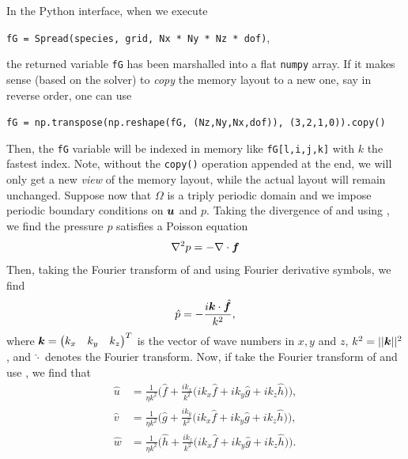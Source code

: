 In the Python interface, when we execute 

\hspace{10pt} \texttt{fG = Spread(species, grid, Nx * Ny * Nz * dof)}, 

the returned variable \texttt{fG} has been marshalled into a flat \texttt{numpy} array. If it makes sense (based on the solver) to \emph{copy} the memory layout to a new one, say in reverse order, one can use

\hspace{10pt} \texttt{fG = np.transpose(np.reshape(fG, (Nz,Ny,Nx,dof)), (3,2,1,0)).copy()}

Then, the \texttt{fG} variable will be indexed in memory like \texttt{fG[l,i,j,k]} with $k$ the fastest index. Note, without the \texttt{copy()} operation appended at the end, we will only get a new \emph{view} of the memory layout, while the actual layout will remain unchanged.
Suppose now that $\Omega$ is a triply periodic domain and we impose periodic boundary conditions on $\boldsymbol u$ and $p$. Taking the divergence of  and using , we find the pressure $p$ satisfies a Poisson equation
\begin{equation}\label{poisson}
\nabla^2 p = -\nabla \cdot \boldsymbol{f}
\end{equation}
Then, taking the Fourier transform of  and using Fourier derivative symbols, we find
\begin{equation}\label{psol}
\hat{p} = \displaystyle -\frac{i\boldsymbol{k} \cdot \hat{\boldsymbol f}}{k^2},
\end{equation}
where $\boldsymbol k = \begin{pmatrix} k_x & k_y & k_z\end{pmatrix}^T$ is the vector of wave numbers in $x, y$ and $z$, $k^2 = ||\boldsymbol k||^2$, and $\hat{\cdot}$ denotes the Fourier transform. Now, if take the Fourier transform of  and use , we find that
\begin{align}
\hat{u} &= \displaystyle \frac{1}{\eta k^2}\Big(\hat{f} + \frac{ik_x}{k^2}\big(ik_x \hat{f} + ik_y \hat{g} + ik_z \hat{h}\big)\Big),\\
\hat{v} &= \displaystyle \frac{1}{\eta k^2}\Big(\hat{g} + \frac{ik_y}{k^2}\big(ik_x \hat{f} + ik_y \hat{g} + ik_z \hat{h}\big)\Big),\\
\hat{w} &= \displaystyle \frac{1}{\eta k^2}\Big(\hat{h} + \frac{ik_z}{k^2}\big(ik_x \hat{f} + ik_y \hat{g} + ik_z \hat{h}\big)\Big).
\end{align}

